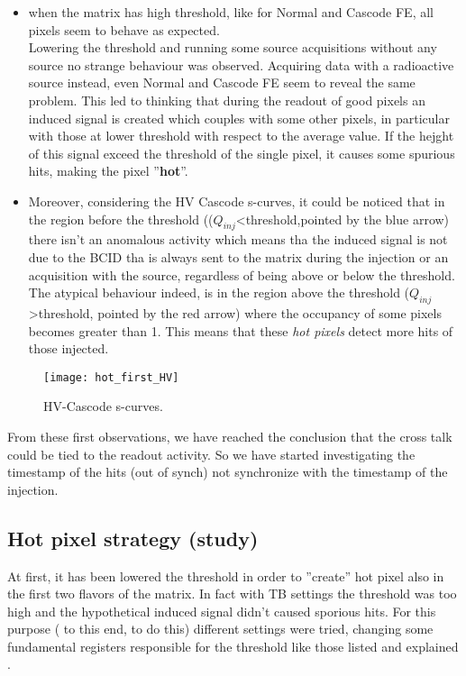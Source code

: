 \begin{itemize}
\item when the matrix has high threshold, like for Normal and Cascode FE, all pixels seem to behave as expected.\\ Lowering the threshold and running some source acquisitions without any source no strange behaviour was observed. Acquiring data with a radioactive source instead, even Normal and Cascode FE seem to reveal the same problem. This led to thinking that during the readout of good pixels an induced signal is created which couples with some other pixels, in particular with those at lower threshold with respect to the average value. If the hejght of this signal exceed the threshold of the single pixel, it causes some spurious hits, making the pixel ''\textbf{hot}''.

\item Moreover, considering the HV Cascode s-curves, it could be noticed that in the region before the threshold (($Q_{inj}$<threshold,pointed by the blue arrow) there isn't an anomalous activity which means tha the induced signal is not due to the BCID tha is always sent to the matrix during the injection or an acquisition with the source, regardless of being above or below the  threshold. The atypical behaviour indeed, is in the region above the threshold ($Q_{inj}$>threshold, pointed by the red arrow) where the occupancy of some pixels becomes greater than 1. This means that these \textit{hot pixels} detect more hits of those injected.

\end{itemize} 

\begin{figure}[h!]
\centering
\texttt{[image: hot\_first\_HV]}
\caption{HV-Cascode s-curves.}
\label{hot_first}
\end{figure}

From these first observations, we have reached the conclusion that the cross talk could be tied to the readout activity. So we have started investigating the timestamp of the hits (out of synch) not synchronize with the timestamp of the injection.


\subsection{Hot pixel strategy (study)}

At first, it has been lowered the threshold in order to ''create'' hot pixel also in the first two flavors of the matrix. In fact with TB settings the threshold was too high and the hypothetical induced signal didn't caused sporious hits. For this purpose ( to this end, to do this) different settings were tried, changing some fundamental registers responsible for the threshold like those listed and explained . 

